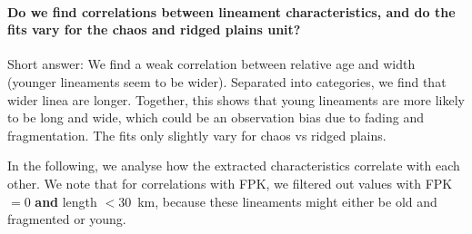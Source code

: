 % 


\paragraph{\textbf{Do we find correlations between lineament characteristics, and do the fits vary for the chaos and ridged plains unit?}} Short answer: We find a weak correlation between relative age and width (younger lineaments seem to be wider). Separated into categories, we find that wider linea are longer. Together, this shows that young lineaments are more likely to be long and wide, which could be an observation bias due to fading and fragmentation. The fits only slightly vary for chaos vs ridged plains.

In the following, we analyse how the extracted characteristics correlate with each other. We note that for correlations with FPK, we filtered out values with FPK$=$0 \textbf{and} length $<$30~km, because these lineaments might either be old and fragmented or young.

